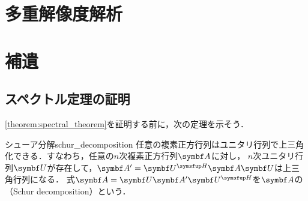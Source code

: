 \documentclass[../../main]{subfiles}
\begin{document}
\section{多重解像度解析}
\label{section:discrete_mra}

\section{補遺}

\subsection{スペクトル定理の証明}
\label{subsection:proof_of_the_spectral_theorem}

\cref{theorem:spectral_theorem}を証明する前に，次の定理を示そう．

\begin{theorem}{シューア分解}{schur_decomposition}
  任意の複素正方行列はユニタリ行列で上三角化できる．すなわち，任意の\(n\)次複素正方行列\(\mat{A}\)に対し，
  \(n\)次ユニタリ行列\(\mat{U}\)が存在して，\(\mat{A}'=\htrps{\mat{U}}\mat{A}\mat{U}\)は上三角行列\footnotemark になる．
  式\(\mat{A}=\mat{U}\mat{A}'\htrps{\mat{U}}\)を\(\mat{A}\)の（Schur decomposition）という．
\end{theorem}
\end{document}
